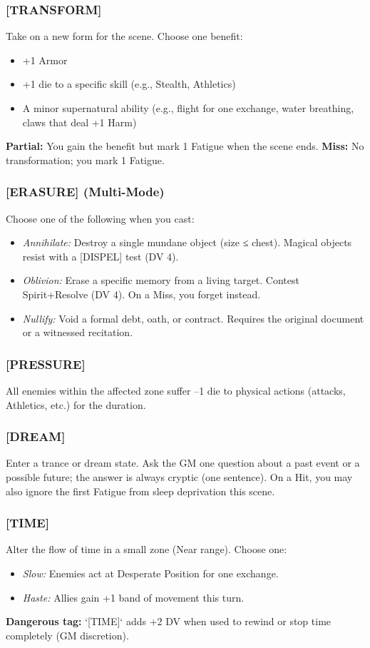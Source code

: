 \subsubsection{[TRANSFORM]}
Take on a new form for the scene. Choose one benefit:
\begin{itemize}
  \item +1 Armor
  \item +1 die to a specific skill (e.g., Stealth, Athletics)
  \item A minor supernatural ability (e.g., flight for one exchange, water breathing, claws that deal +1 Harm)
\end{itemize}
\textbf{Partial:} You gain the benefit but mark 1 Fatigue when the scene ends. \textbf{Miss:} No transformation; you mark 1 Fatigue.

\subsubsection{[ERASURE] (Multi-Mode)}
Choose one of the following when you cast:
\begin{itemize}
  \item \textit{Annihilate:} Destroy a single mundane object (size ≤ chest). Magical objects resist with a [DISPEL] test (DV 4).
  \item \textit{Oblivion:} Erase a specific memory from a living target. Contest Spirit+Resolve (DV 4). On a Miss, you forget instead.
  \item \textit{Nullify:} Void a formal debt, oath, or contract. Requires the original document or a witnessed recitation.
\end{itemize}

\subsubsection{[PRESSURE]}
All enemies within the affected zone suffer --1 die to physical actions (attacks, Athletics, etc.) for the duration.

\subsubsection{[DREAM]}
Enter a trance or dream state. Ask the GM one question about a past event or a possible future; the answer is always cryptic (one sentence). On a Hit, you may also ignore the first Fatigue from sleep deprivation this scene.

\subsubsection{[TIME]}
Alter the flow of time in a small zone (Near range). Choose one:
\begin{itemize}
  \item \textit{Slow:} Enemies act at Desperate Position for one exchange.
  \item \textit{Haste:} Allies gain +1 band of movement this turn.
\end{itemize}
\textbf{Dangerous tag:} `[TIME]` adds +2 DV when used to rewind or stop time completely (GM discretion).

